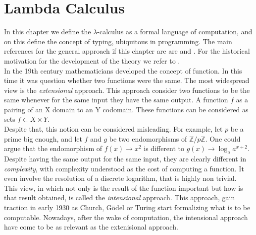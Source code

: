 
\chapter{Lambda Calculus}
\thispagestyle{empty}
In this chapter we define the $\lambda$-calculus as a formal language of computation, and on this define the concept of typing, ubiquitous in programming. The main references  for the general approach if this chapter are are \cite{selinger2008lecture} and \cite{hindley2008lambda}. For the historical motivation for the development of the theory  we refer to \cite{cardone2006history}.  \\


In the 19th century mathematicians developed the concept of function. In this time it was question whether two functions were the same. The most widespread view is the \emph{extensional} approach. This approach consider two functions to be the same whenever for the same input they have the same output. A function $f$ as a pairing of an X domain to an Y codomain. These functions can be considered as sets $f\subset X \times Y$.\\

Despite that, this notion can be considered misleading. For example, let $p$ be a prime big enough, and let $f$ and $g$ be two endomorphisms of  $\mathbb{Z}/p\mathbb{Z}$. One could argue that the endomorphism of  $f(x)\to x^2$ is different to $g(x) \to \log_a a^{x+2}$. Despite having the same output for the same input, they are clearly different in \emph{complexity}, with complexity understood as the cost of computing a function. It even involve the resolution of a discrete logarithm, that is highly non trivial. \\

This view, in which not only is the result of the function important but how is that result obtained, is called the \emph{intensional} approach. This approach, gain traction in early 1930 as Church\cite{church1932set}, Gödel\cite{adams2011early} or Turing\cite{turing1938computable} start formalizing what is to be computable. Nowadays, after the wake of computation, the intensional approach have come to be as relevant as the extenisional approach.





